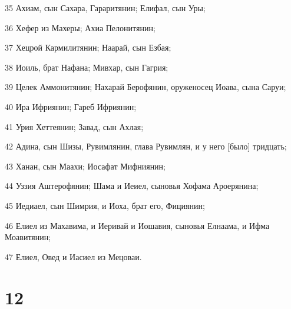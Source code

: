 \par 35 Ахиам, сын Сахара, Гараритянин; Елифал, сын Уры;
\par 36 Хефер из Махеры; Ахиа Пелонитянин;
\par 37 Хецрой Кармилитянин; Наарай, сын Езбая;
\par 38 Иоиль, брат Нафана; Мивхар, сын Гагрия;
\par 39 Целек Аммонитянин; Нахарай Берофянин, оруженосец Иоава, сына Саруи;
\par 40 Ира Ифриянин; Гареб Ифриянин;
\par 41 Урия Хеттеянин; Завад, сын Ахлая;
\par 42 Адина, сын Шизы, Рувимлянин, глава Рувимлян, и у него [было] тридцать;
\par 43 Ханан, сын Маахи; Иосафат Мифниянин;
\par 44 Уззия Аштерофянин; Шама и Иеиел, сыновья Хофама Ароерянина;
\par 45 Иедиаел, сын Шимрия, и Иоха, брат его, Фициянин;
\par 46 Елиел из Махавима, и Иеривай и Иошавия, сыновья Елнаама, и Ифма Моавитянин;
\par 47 Елиел, Овед и Иасиел из Мецоваи.

\chapter{12}

